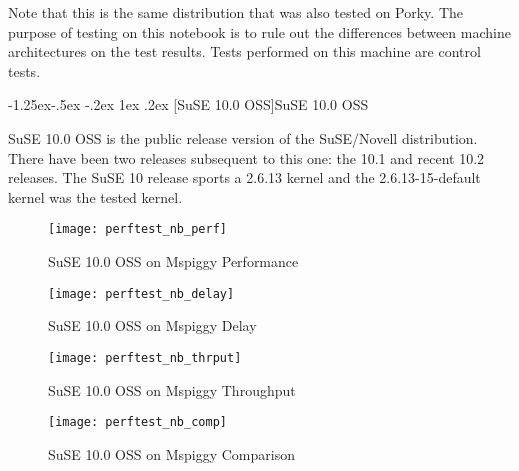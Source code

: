 \documentclass[letterpaper,final,notitlepage,twocolumn,10pt,twoside]{article}
\makeatletter
\renewcommand\subsubsection{\@startsection{subsubsection}{3}{\z@}%
                                     {-1.25ex\@plus -.5ex \@minus -.2ex}%
                                     {1ex \@plus .2ex}%
                                     {\normalfont\normalsize\bfseries}}
\makeatother
\begin{document}
Note that this is the same distribution that was also tested on Porky.  The purpose of testing on
this notebook is to rule out the differences between machine architectures on the test results.
Tests performed on this machine are control tests.

\subsubsection[SuSE 10.0 OSS]{SuSE 10.0 OSS}

SuSE 10.0 OSS is the public release version of the SuSE/Novell distribution.  There have been two
releases subsequent to this one: the 10.1 and recent 10.2 releases.  The SuSE 10 release sports a
2.6.13 kernel and the 2.6.13-15-default kernel was the tested kernel.

\begin{figure}[p]
\texttt{[image: perftest\_nb\_perf]}
\caption[SuSE 10.0 OSS on Mspiggy Performance]{SuSE 10.0 OSS on Mspiggy Performance}
\label{figure:nbperf}
\end{figure}

\begin{figure}[p]
\texttt{[image: perftest\_nb\_delay]}
\caption[SuSE 10.0 OSS on Mspiggy Delay]{SuSE 10.0 OSS on Mspiggy Delay}
\label{figure:nbdelay}
\end{figure}

\begin{figure}[p]
\texttt{[image: perftest\_nb\_thrput]}
\caption[SuSE 10.0 OSS on Mspiggy Throughput]{SuSE 10.0 OSS on Mspiggy Throughput}
\label{figure:nbthrput}
\end{figure}

\begin{figure}[pt]
\texttt{[image: perftest\_nb\_comp]}
\caption[SuSE 10.0 OSS on Mspiggy Comparison]{SuSE 10.0 OSS on Mspiggy Comparison}
\label{figure:nbcomp}
\end{figure}
\end{document}
